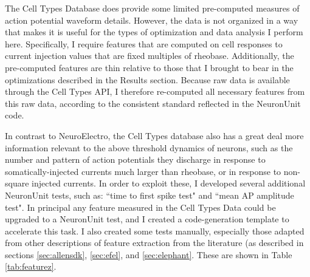 The Cell Types Database does provide some limited pre-computed measures of action potential waveform details. 
However, the data is not organized in a way that makes it is useful for the types of optimization and data analysis I perform here.
Specifically, I require features that are computed on cell responses to current injection values that are fixed multiples of rheobase.
Additionally, the pre-computed features are thin relative to those that I brought to bear in the optimizations described in the Results section.
Because raw data is available through the Cell Types API, I therefore re-computed all necessary features from this raw data, according to the consistent standard reflected in the NeuronUnit code.

In contrast to NeuroElectro, the Cell Types database also has a great deal more information relevant to the above threshold dynamics of neurons, such as the number and pattern of action potentials they discharge in response to somatically-injected currents much larger than rheobase, or in response to non-square injected currents.
In order to exploit these, I developed several additional NeuronUnit tests, such as: ``time to first spike test" and ``mean AP amplitude test". In principal any feature measured in the Cell Types Data could be upgraded to a NeuronUnit test, and I created a code-generation template to accelerate this task.
I also created some tests manually, especially those adapted from other descriptions of feature extraction from the literature (as described in sections \ref{sec:allensdk}, \ref{sec:efel}, and \ref{sec:elephant}.
These are shown in Table \ref{tab:featurez}.

